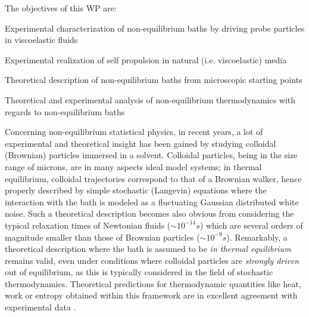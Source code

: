 \begin{workpackage}[id=WPbrown,wphases=0-48,
  short=Brown. particles, %
  title=Brownian particles in nonequilibrium baths, %
  lead=USTUTT,
  USTUTTRM=96,KULRM=6,ULEIRM=6,UNIPDRM=6]

\begin{wpobjectives}
The objectives of this WP are:
\begin{compactitem}
\item Experimental characterization of non-equilibrium baths by driving probe particles in viscoelastic fluids
\item Experimental realization of self propulsion in natural (i.e. viscoelastic) media
\item Theoretical description of non-equilibrium baths from microscopic starting points
\item Theoretical and experimental analysis of non-equilibrium thermodynamics with regards to non-equilibrium baths
  \end{compactitem}
\end{wpobjectives}

\begin{wpdescription}

Concerning non-equilibrium statistical physics, in recent years, a lot of experimental and
theoretical insight has been gained by studying colloidal (Brownian) particles immersed in a solvent.
Colloidal particles, being in the size range of microns, are in many aspects ideal
model systems; in thermal equilibrium, colloidal trajectories correspond to that of a Brownian walker, hence properly described by
simple stochastic (Langevin) equations where the interaction with the bath is modeled as a fluctuating Gaussian distributed white noise. 
Such a theoretical description becomes also obvious from considering the typical relaxation times of Newtonian fluids ($\sim 10^{-14} s$) which are several orders of magnitude 
smaller than those of Brownian particles ($\sim 10^{-9} s$). Remarkably, a theoretical description where the bath is assumed to be {\it in thermal equilibrium} remains valid, even under conditions where colloidal particles are {\it strongly driven} out of equilibrium, as this is typically considered in the field of stochastic thermodynamics. Theoretical predictions for thermodynamic quantities like heat, work or entropy obtained within this framework are in excellent agreement with experimental data \cite{blickle2006, blickle2007, blickle2012}.



\end{wpdescription}
\end{workpackage}
